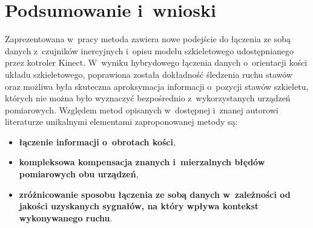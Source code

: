 \chapter{Podsumowanie i~wnioski }\label{chap:finalSummary}



Zaprezentowana w~pracy metoda zawiera nowe podejście do łączenia ze sobą danych z~czujników inercyjnych i~opisu modelu szkieletowego udostępnianego przez kotroler Kinect. W~wyniku hybrydowego łączenia danych o~orientacji kości układu szkieletowego, poprawiona została dokładność śledzenia ruchu stawów oraz możliwa była skuteczna aproksymacja informacji o~pozycji stawów szkieletu, których nie można było wyznaczyć bezpośrednio z~wykorzystanych urządzeń pomiarowych. Względem metod opisanych w~dostępnej i~znanej autorowi literaturze unikalnymi elementami zaproponowanej metody są:
\begin{itemize}
	\item \textbf{łączenie informacji o~obrotach kości},\\
	\item \textbf{kompleksowa kompensacja znanych i~mierzalnych błędów pomiarowych obu urządzeń}, \\
	\item \textbf{zróżnicowanie sposobu łączenia ze sobą danych w~zależności od jakości uzyskanych sygnałów, na który wpływa kontekst wykonywanego ruchu}.
\end{itemize}


